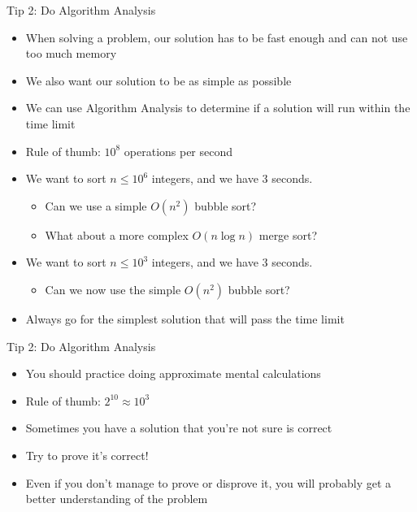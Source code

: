 \documentclass[10pt]{beamer}
\newcommand{\bi}{\begin{itemize}}
\newcommand{\ei}{\end{itemize}}
\begin{document}
\begin{frame}{Tip 2: Do Algorithm Analysis}
    \bi
        \item When solving a problem, our solution has to be fast enough and can not use too much memory
        \item We also want our solution to be as simple as possible
        \vspace{5pt}
        \item We can use Algorithm Analysis to determine if a solution will run within the time limit
        \item Rule of thumb: $10^{8}$ operations per second
        \vspace{10pt}
        \item<2-> We want to sort $n \leq 10^{6}$ integers, and we have 3 seconds.
            \bi
                \item Can we use a simple $O(n^2)$ bubble sort?
                \item What about a more complex $O(n\log n)$ merge sort?
            \ei
        \vspace{5pt}
        \item<3-> We want to sort $n \leq 10^{3}$ integers, and we have 3 seconds.
            \bi
                \item Can we now use the simple $O(n^2)$ bubble sort?
            \ei
        \vspace{5pt}
        \item<4-> Always go for the simplest solution that will pass the time limit
    \ei
\end{frame}

\begin{frame}{Tip 2: Do Algorithm Analysis}
    \bi
        \item You should practice doing approximate mental calculations
        \item Rule of thumb: $2^{10} \approx 10^{3}$
        \vspace{10pt}
        \item Sometimes you have a solution that you're not sure is correct
        \item Try to prove it's correct!
        \item Even if you don't manage to prove or disprove it, you will probably get a better understanding of the problem
        \vspace{20pt}
    \ei
\end{frame}
\end{document}
